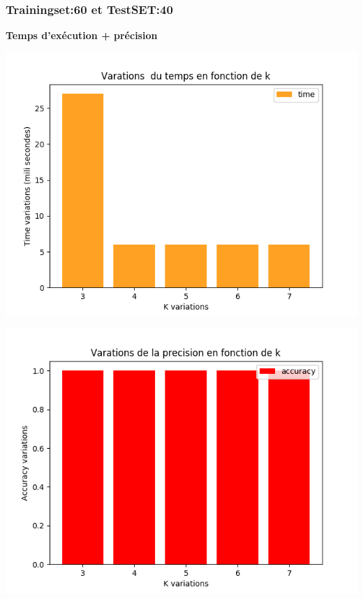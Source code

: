 \documentclass[12pt,a4paper,oneside]{book}
\begin{document}
	
	
	
	\subsubsection{Trainingset:60 et TestSET:40}
	\textbf{Temps d'exécution + précision}\\
	\begin{frame}{}
		\centering
		\begin{minipage}[b]{0.5\linewidth}
			\includegraphics[scale=0.5]{image/labor:Train,60,Test,40time.png}
			\label{labelname}%
		\end{minipage}
		\hspace{0.5cm}
		\begin{minipage}[b]{0.5\linewidth}
			\includegraphics[scale=0.5]{image/labor:Train,60,Test,40:accuracy.png}%
			\label{labelname}%
		\end{minipage}
	\end{frame}
	
\end{document}
